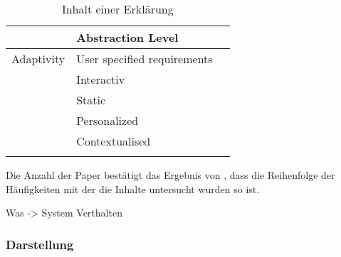 \begin{longtable}{|p{}|p{}|p{}|}
                        & Abstraction Level & \cite{thomson_knowledge--information_2020} \\
    \hline
    Adaptivity          & User specified requirements & \cite{tintarev_designing_nodate} \\
                        & Interactiv  & \cite{abdulrahman_belief-based_2019} \cite{cheng2019explaining} \\
                        & Static & \cite{abdulrahman_belief-based_2019} \\
                        & Personalized & \cite{kaptein_personalised_2017} \cite{cassens_ambient_2019}  \cite{sokol_one_2020} \\
                        & Contextualised & \cite{kaptein_personalised_2017} \cite{cassens_ambient_2019} \\
    \hline
\caption{Inhalt einer Erklärung}
\label{tab:content_of_explanations}
\end{longtable}

Die Anzahl der Paper bestätigt das Ergebnis von \cite{chazette_end-users_nodate}, dass die Reihenfolge der Häufigkeiten mit der die Inhalte untersucht wurden so ist.

Was -> System Verthalten

\subsubsection*{Darstellung}

